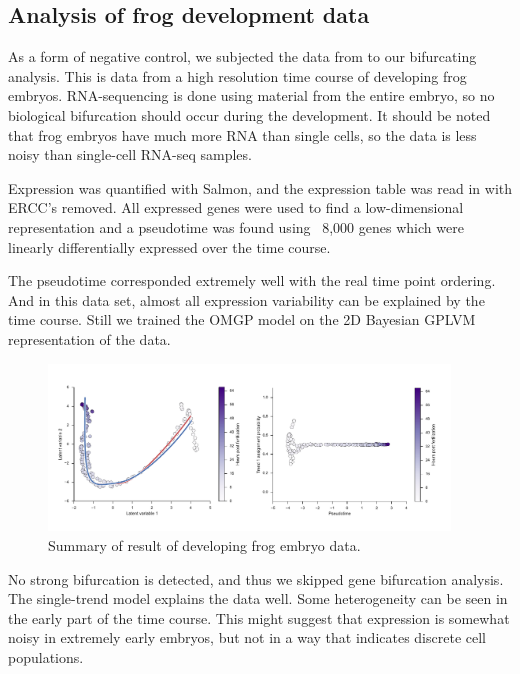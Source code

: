 \subsection{Analysis of frog development data}

As a form of negative control, we subjected the data from \cite{Owens2016-op} to our bifurcating analysis. This is data from a high resolution time course of developing frog embryos. RNA-sequencing is done using material from the entire embryo, so no biological bifurcation should occur during the development. It should be noted that frog embryos have much more RNA than single cells, so the data is less noisy than single-cell RNA-seq samples.

Expression was quantified with Salmon, and the expression table was read in with ERCC's removed. All expressed genes were used to find a low-dimensional representation and a pseudotime was found using ~8,000 genes which were linearly differentially expressed over the time course.

The pseudotime corresponded extremely well with the real time point ordering. And in this data set, almost all expression variability can be explained by the time course. Still we trained the OMGP model on the 2D Bayesian GPLVM representation of the data.

\begin{figure}
    \centering
    \includegraphics[width=0.95\textwidth]{frog-illustration.pdf}
    \caption{Summary of  result of \citet{Owens2016-op} developing frog embryo data.}
    \label{fig:owens}
\end{figure}

No strong bifurcation is detected, and thus we skipped gene bifurcation analysis. The single-trend model explains the data well. Some heterogeneity can be seen in the early part of the time course. This might suggest that expression is somewhat noisy in extremely early embryos, but not in a way that indicates discrete cell populations.

